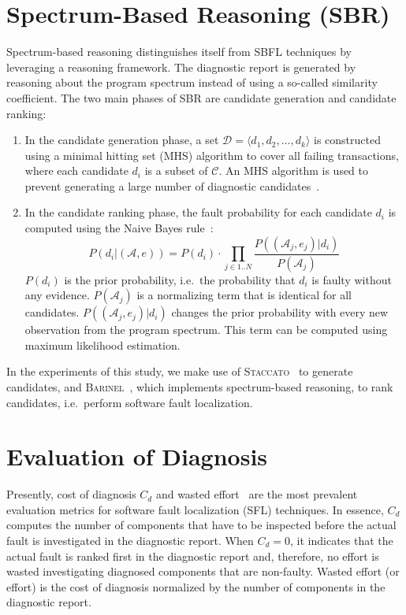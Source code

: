 \documentclass[twoside,a4paper,11pt]{memoir}
\begin{document}
\section{Spectrum-Based Reasoning (SBR)}%
\label{sec:sbr}
Spectrum-based reasoning distinguishes itself from SBFL techniques by leveraging a reasoning framework.
The diagnostic report is generated by reasoning about the program spectrum instead of using a so-called similarity coefficient.
The two main phases of SBR are candidate generation and candidate ranking:
\begin{enumerate}
  \item In the candidate generation phase, a set \(\mathcal{D} = \langle d_1, d_2, \dots, d_k \rangle \) is constructed using a minimal hitting set (MHS) algorithm to cover all failing transactions, where each candidate \(d_i \) is a subset of \(\mathcal{C} \).
  An MHS algorithm is used to prevent generating a large number of diagnostic candidates~\cite{Abreu:2009:SMF:1747491.1747511}.

  \item In the candidate ranking phase, the fault probability for each candidate \(d_i \) is computed using the Naive Bayes rule~\cite{Abreu:2009:SMF:1747491.1747511}:
  \begin{equation}
    P(d_i | (\mathcal{A}, e)) = P(d_i) \cdot \prod_{j \in 1..N} \frac{P((\mathcal{A}_j, e_j) | d_i)}{P(\mathcal{A}_j)}
  \end{equation}
  \(P(d_i) \) is the prior probability, i.e.\ the probability that \(d_i \) is faulty without any evidence.
  \(P(\mathcal{A}_j) \) is a normalizing term that is identical for all candidates.
  \(P((\mathcal{A}_j, e_j) | d_i) \) changes the prior probability with every new observation from the program spectrum.
  This term can be computed using maximum likelihood estimation.
\end{enumerate}

In the experiments of this study, we make use of \textsc{Staccato}~\cite{conf/sara/AbreuG09} to generate candidates, and \textsc{Barinel}~\cite{Abreu:2009:SMF:1747491.1747511}, which implements spectrum-based reasoning, to rank candidates, i.e.\ perform software fault localization.

\section{Evaluation of Diagnosis}
Presently, cost of diagnosis \(C_d \) and wasted effort~\cite{Abreu:2009:SMF:1747491.1747511, 7390282, 6693085, Steimann:2013:TVV:2483760.2483767, DBLP:conf/icse/PerezAD17} are the most prevalent evaluation metrics for software fault localization (SFL) techniques.
In essence, \(C_d \) computes the number of components that have to be inspected before the actual fault is investigated in the diagnostic report.
When \(C_d = 0 \), it indicates that the actual fault is ranked first in the diagnostic report and, therefore, no effort is wasted investigating diagnosed components that are non-faulty.
Wasted effort (or effort) is the cost of diagnosis normalized by the number of components in the diagnostic report.
\end{document}
